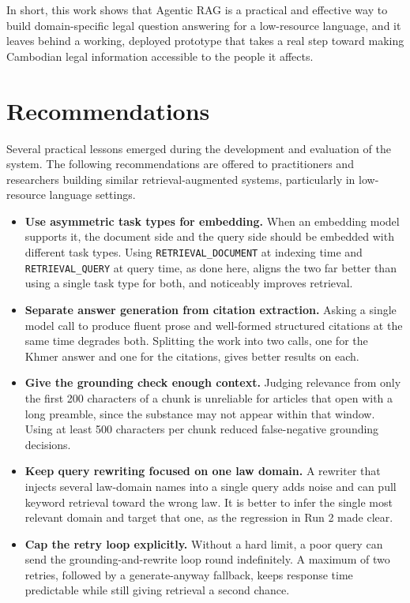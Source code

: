 \hs In short, this work shows that Agentic RAG is a practical and effective way to build
domain-specific legal question answering for a low-resource language, and it leaves behind
a working, deployed prototype that takes a real step toward making Cambodian legal
information accessible to the people it affects.

\section{Recommendations}

\hs Several practical lessons emerged during the development and evaluation of the system.
The following recommendations are offered to practitioners and researchers building
similar retrieval-augmented systems, particularly in low-resource language settings.

\begin{itemize}

    \item \textbf{Use asymmetric task types for embedding.} When an embedding model
    supports it, the document side and the query side should be embedded with different
    task types. Using \texttt{RETRIEVAL\_DOCUMENT} at indexing time and
    \texttt{RETRIEVAL\_QUERY} at query time, as done here, aligns the two far better than
    using a single task type for both, and noticeably improves retrieval.

    \item \textbf{Separate answer generation from citation extraction.} Asking a single
    model call to produce fluent prose and well-formed structured citations at the same
    time degrades both. Splitting the work into two calls, one for the Khmer answer and one
    for the citations, gives better results on each.

    \item \textbf{Give the grounding check enough context.} Judging relevance from only the
    first 200 characters of a chunk is unreliable for articles that open with a long
    preamble, since the substance may not appear within that window. Using at least 500
    characters per chunk reduced false-negative grounding decisions.

    \item \textbf{Keep query rewriting focused on one law domain.} A rewriter that injects
    several law-domain names into a single query adds noise and can pull keyword retrieval
    toward the wrong law. It is better to infer the single most relevant domain and target
    that one, as the regression in Run 2 made clear.

    \item \textbf{Cap the retry loop explicitly.} Without a hard limit, a poor query can
    send the grounding-and-rewrite loop round indefinitely. A maximum of two retries,
    followed by a generate-anyway fallback, keeps response time predictable while still
    giving retrieval a second chance.

\end{itemize}

